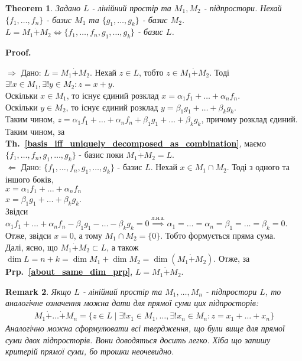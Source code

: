 \documentclass[a4paper, 10pt]{article}
\makeatletter
\def\rightproof{$\boxed{\Rightarrow}$ }
\def\leftproof{$\boxed{\Leftarrow}$ }
\theoremstyle{theoremdd}
\newtheorem{theorem}{Theorem}[subsection]
\newtheorem{remark}[theorem]{Remark}
\newcommand\thref[1]{\textbf{Th.~\ref{#1}}}
\newcommand\prpref[1]{\textbf{Prp.~\ref{#1}}}
\renewenvironment{proof}[1][Proof.\\]{\par
\pushQED{\hfill \qed}%
\normalfont \topsep6\p@\@plus6\p@\relax
\trivlist
\item\relax
{\bfseries
#1\@addpunct{.}}\hspace\labelsep\ignorespaces
}{%
\popQED\endtrivlist\@endpefalse
}
\makeatother
\begin{document}
	\begin{theorem}
	\label{direct_sum_iff_union_of_bases_is_basis}
	Задано $L$ - лінійний простір та $M_1,M_2$ - підпростори. Нехай $\{f_1,\dots,f_n\}$ - базис $M_1$ та  $\{g_1,\dots,g_k\}$ - базис $M_2$.\\
	$L = M_1 \dot{+} M_2 \iff \{f_1,\dots,f_n,g_1,\dots,g_k\}$ - базис $L$.
	\end{theorem}
	
	\begin{proof}
	\rightproof Дано: $L = M_1 \dot{+} M_2$. Нехай $z \in L$, тобто $z \in M_1 \dot{+} M_2$. Тоді $\exists! x \in M_1, \exists! y \in M_2: z = x+y$.\\
	Оскільки $x \in M_1$, то існує єдиний розклад $x = \alpha_1 f_1 + \dots + \alpha_n f_n$.\\
	Оскільки $y \in M_2$, то існує єдиний розклад $y = \beta_1 g_1 + \dots + \beta_k g_k$.\\
	Таким чином, $z = \alpha_1 f_1 + \dots + \alpha_n f_n + \beta_1 g_1 + \dots + \beta_k g_k$, причому розклад єдиний. Таким чином, за \thref{basis_iff_uniquely_decomposed_as_combination}, маємо $\{f_1,\dots,f_n,g_1,\dots,g_k\}$ - базис поки $M_1 \dot{+} M_2 = L$. 
	\bigskip \\
	\leftproof Дано: $\{f_1,\dots,f_n,g_1,\dots,g_k\}$ - базис $L$.
	Нехай $x \in M_1 \cap M_2$. Тоді з одного та іншого боків,\\
	$x = \alpha_1 f_1 + \dots + \alpha_n f_n$\\
	$x = \beta_1 g_1 + \dots + \beta_k g_k$.\\
	Звідси $\alpha_1 f_1 + \dots + \alpha_n f_n - \beta_1 g_1 - \dots - \beta_k g_k = 0 \overset{\text{л.н.з.}}{\implies} \alpha_1 = \dots = \alpha_n = \beta_1 = \dots = \beta_k = 0$.\\
	Отже, звідси $x = 0$, а тому $M_1 \cap M_2 = \{0\}$. Тобто формується пряма сума.\\
	Далі, ясно, що $M_1 \dot{+} M_2 \subset L$, а також $\dim L = n+k = \dim M_1 + \dim M_2 = \dim (M_1 \dot{+} M_2)$. Отже, за \prpref{about_same_dim_prp}, $L = M_1 \dot{+} M_2$.
	\end{proof}
	
	\begin{remark}
	Якщо $L$ - лінійний простір та $M_1,\dots,M_n$ - підпростори $L$, то аналогічне означення можна дати для прямої суми цих підпросторів:
	\begin{align*}
M_1 \dot{+} \dots \dot{+} M_n = \{z \in L \mid \exists !x_1 \in M_1, \dots, \exists! x_n \in M_n: z = x_1 + \dots + x_n\}
	\end{align*}
	Аналогічно можна сформулювати всі твердження, що були вище для прямої суми двох підпросторів. Вони доводяться досить легко. Хіба що запишу критерій прямої суми, бо трошки неочевидно.
	\end{remark}
	
\end{document}
